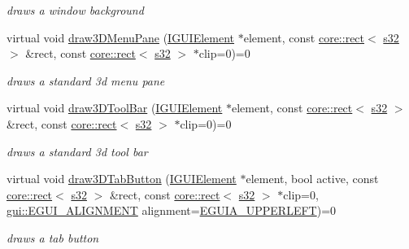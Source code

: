 \begin{DoxyCompactItemize}
\begin{DoxyCompactList}\small\item\em draws a window background \end{DoxyCompactList}\item 
virtual void \hyperlink{classirr_1_1gui_1_1IGUISkin_a1fce02fb3795fc5e71e775a6396fe0eb}{draw3\+D\+Menu\+Pane} (\hyperlink{classirr_1_1gui_1_1IGUIElement}{I\+G\+U\+I\+Element} $\ast$element, const \hyperlink{classirr_1_1core_1_1rect}{core\+::rect}$<$ \hyperlink{namespaceirr_ac66849b7a6ed16e30ebede579f9b47c6}{s32} $>$ \&rect, const \hyperlink{classirr_1_1core_1_1rect}{core\+::rect}$<$ \hyperlink{namespaceirr_ac66849b7a6ed16e30ebede579f9b47c6}{s32} $>$ $\ast$clip=0)=0
\begin{DoxyCompactList}\small\item\em draws a standard 3d menu pane \end{DoxyCompactList}\item 
virtual void \hyperlink{classirr_1_1gui_1_1IGUISkin_a8510de5c6bcd0dae99b9b77ac39aba6b}{draw3\+D\+Tool\+Bar} (\hyperlink{classirr_1_1gui_1_1IGUIElement}{I\+G\+U\+I\+Element} $\ast$element, const \hyperlink{classirr_1_1core_1_1rect}{core\+::rect}$<$ \hyperlink{namespaceirr_ac66849b7a6ed16e30ebede579f9b47c6}{s32} $>$ \&rect, const \hyperlink{classirr_1_1core_1_1rect}{core\+::rect}$<$ \hyperlink{namespaceirr_ac66849b7a6ed16e30ebede579f9b47c6}{s32} $>$ $\ast$clip=0)=0
\begin{DoxyCompactList}\small\item\em draws a standard 3d tool bar \end{DoxyCompactList}\item 
virtual void \hyperlink{classirr_1_1gui_1_1IGUISkin_a9e7027309a52d17554be984554134426}{draw3\+D\+Tab\+Button} (\hyperlink{classirr_1_1gui_1_1IGUIElement}{I\+G\+U\+I\+Element} $\ast$element, bool active, const \hyperlink{classirr_1_1core_1_1rect}{core\+::rect}$<$ \hyperlink{namespaceirr_ac66849b7a6ed16e30ebede579f9b47c6}{s32} $>$ \&rect, const \hyperlink{classirr_1_1core_1_1rect}{core\+::rect}$<$ \hyperlink{namespaceirr_ac66849b7a6ed16e30ebede579f9b47c6}{s32} $>$ $\ast$clip=0, \hyperlink{namespaceirr_1_1gui_a19eb5fb40e67f108cb16aba922ddaa2d}{gui\+::\+E\+G\+U\+I\+\_\+\+A\+L\+I\+G\+N\+M\+E\+NT} alignment=\hyperlink{namespaceirr_1_1gui_a19eb5fb40e67f108cb16aba922ddaa2da29a8bc6d2531cca02458ca8809aa2b75}{E\+G\+U\+I\+A\+\_\+\+U\+P\+P\+E\+R\+L\+E\+FT})=0
\begin{DoxyCompactList}\small\item\em draws a tab button \end{DoxyCompactList}\item 

\end{DoxyCompactItemize}
